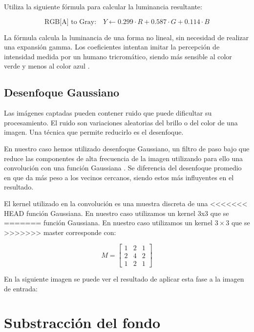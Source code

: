 Utiliza la siguiente fórmula para calcular la luminancia resultante:

\begin{equation*}
    \text{RGB[A] to Gray:} \quad Y \leftarrow 0.299 \cdot R + 0.587 \cdot G + 0.114 \cdot B
\end{equation*}

La fórmula calcula la luminancia de una forma no lineal, sin necesidad
de realizar una expansión gamma. Los coeficientes intentan imitar la
percepción de intensidad medida por un humano tricromático, siendo más
sensible al color verde y menos al color azul \citep{wiki:grayscale}.

\subsection{Desenfoque Gaussiano}\label{desenfoque-gaussiano}

Las imágenes captadas pueden contener ruido que puede dificultar su
procesamiento. El ruido son variaciones aleatorias del brillo o del
color de una imagen. Una técnica que permite reducirlo es el desenfoque.

En nuestro caso hemos utilizado desenfoque Gaussiano, un filtro de paso
bajo que reduce las componentes de alta frecuencia de la imagen
utilizando para ello una convolución con una función Gaussiana
\citep{wiki:gaussian}. Se diferencia del desenfoque promedio en que da
más peso a los vecinos cercanos, siendo estos más influyentes en el
resultado.

El kernel utilizado en la convolución es una muestra discreta de una
<<<<<<< HEAD
función Gaussiana. En nuestro caso utilizamos un kernel 3x3 que se
=======
función Gaussiana. En nuestro caso utilizamos un kernel $3 \times 3$ que se
>>>>>>> master
corresponde con: \citep{book:mastering_opencv}

\begin{equation*}
    M = 
    \begin{bmatrix}
    1 & 2 & 1 \\[0.3em] 
    2 & 4 & 2 \\[0.3em] 
    1 & 2 & 1
    \end{bmatrix}
\end{equation*}

En la siguiente imagen se puede ver el resultado de aplicar esta fase a
la imagen de entrada:


\section{Substracción del fondo}\label{substraccion-del-fondo}

